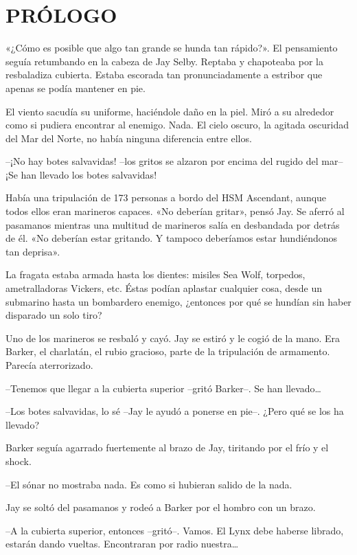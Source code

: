 \chapter*{PRÓLOGO}

{«¿Cómo es posible que algo tan grande se hunda tan rápido?». El
 pensamiento seguía retumbando en la cabeza de Jay Selby. Reptaba y
 chapoteaba por la resbaladiza cubierta. Estaba escorada tan
pronunciadamente a estribor que apenas se podía mantener en pie.}

{El viento sacudía su uniforme, haciéndole daño en la piel. Miró a su
 alrededor como si pudiera encontrar al enemigo. Nada. El cielo oscuro,
 la agitada oscuridad del Mar del Norte, no había ninguna diferencia
entre ellos.}

{--¡No hay botes salvavidas! --los gritos se alzaron por encima del
rugido del mar-- ¡Se han llevado los botes salvavidas!}

{Había una tripulación de 173 personas a bordo del HSM Ascendant, aunque
 todos ellos eran marineros capaces. «No deberían gritar», pensó Jay. Se
 aferró al pasamanos mientras una multitud de marineros salía en
 desbandada por detrás de él. «No deberían estar gritando. Y tampoco
deberíamos estar hundiéndonos tan deprisa».}

{La fragata estaba armada hasta los dientes: misiles Sea Wolf, torpedos,
 ametralladoras Vickers, etc. Éstas podían aplastar cualquier cosa, desde
 un submarino hasta un bombardero enemigo, ¿entonces por qué se hundían
sin haber disparado un solo tiro?}

{Uno de los marineros se resbaló y cayó. Jay se estiró y le cogió de la
 mano. Era Barker, el charlatán, el rubio gracioso, parte de la
tripulación de armamento. Parecía aterrorizado.}

{--Tenemos que llegar a la cubierta superior --gritó Barker--. Se han
 llevado\ldots{}}

{--Los botes salvavidas, lo sé --Jay le ayudó a ponerse en pie--. ¿Pero
qué se los ha llevado?}

{Barker seguía agarrado fuertemente al brazo de Jay, tiritando por el
frío y el shock.}

{--El sónar no mostraba nada. Es como si hubieran salido de la nada.}

{Jay se soltó del pasamanos y rodeó a Barker por el hombro con un
brazo.}

{--A la cubierta superior, entonces --gritó--. Vamos. El Lynx debe
 haberse librado, estarán dando vueltas. Encontraran por radio
 nuestra\ldots{}}


